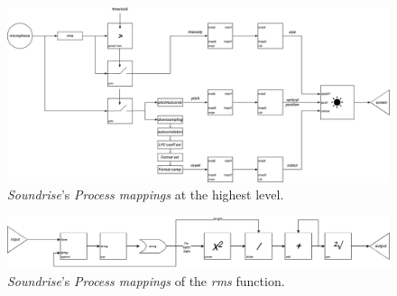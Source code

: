 \begin{figure}[!h]
    \centering
    \includegraphics[width=\linewidth]{chapters/appendix/d/image/graphd-mapping-process.png}
    \caption{\textit{Soundrise}’s \textit{Process mappings} at the highest level.}
    \label{fig:ad-mapping-process}
\end{figure}

\begin{figure}[!h]
    \centering
    \includegraphics[width=\linewidth]{chapters/appendix/d/image/graphd-mapping-process02.drawio.png}
    \caption{\textit{Soundrise}’s \textit{Process mappings} of the \textit{rms} function.}
    \label{fig:ad-mapping-process02}
\end{figure}

